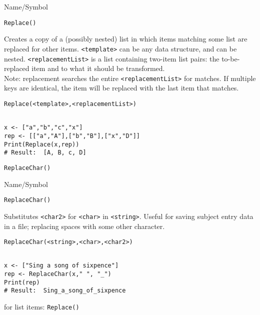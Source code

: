 \begin{desc}{Name/Symbol}
\item[Name/Symbol] \verb+Replace()+

\item[Description]  	Creates a copy of a (possibly nested) list in which
		items matching some list are replaced for other items.  
		\verb+<template>+ can be any data structure, and can be nested.  
		\verb+<replacementList>+ is a list containing two-item list pairs:
		the to-be-replaced item and to what it should be transformed.\\
		Note: replacement searches the entire \verb+<replacementList>+ for 
		matches.  If multiple keys are identical, the item will be 
		replaced with the last item that matches.

\item[Usage]        	
\begin{verbatim}
Replace(<template>,<replacementList>)
\end{verbatim}
			  
\item[Example]     	
\begin{verbatim}

x <- ["a","b","c","x"]
rep <- [["a","A"],["b","B"],["x","D"]]
Print(Replace(x,rep))
# Result:  [A, B, c, D] 
\end{verbatim}

\item[See Also]	
\verb+ReplaceChar()+
\end{desc}

\rl


\begin{desc}{Name/Symbol}
\item[Name/Symbol]  \verb+ReplaceChar()+

\item[Description]  	Substitutes  \verb+<char2>+ for \verb+<char>+
  in \verb+<string>+. Useful for saving subject entry data in a file;
  replacing spaces with some other character.

\item[Usage]        	
\begin{verbatim}
ReplaceChar(<string>,<char>,<char2>)
\end{verbatim}
			  
\item[Example]     	
\begin{verbatim}

x <- ["Sing a song of sixpence"]
rep <- ReplaceChar(x," ", "_")
Print(rep)
# Result:  Sing_a_song_of_sixpence
\end{verbatim}

\item[See Also]	
 for list items: \verb+Replace()+ 
\end{desc}

